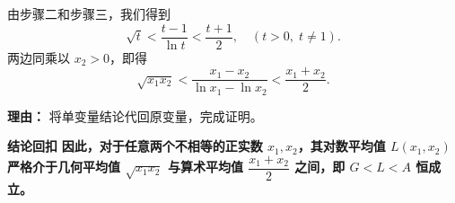 \begin{proofbox}
\begin{description}[style=nextline, leftmargin=2.8em, labelsep=0.5em, itemsep=0.55em]
    \item[\textbf{步骤四（合并结论）：}] 由步骤二和步骤三，我们得到
    \[
    \sqrt{t} < \frac{t-1}{\ln t} < \frac{t+1}{2},\quad (t>0,\; t\neq 1).
    \]
    两边同乘以 $x_2>0$，即得
    \[
    \sqrt{x_1 x_2} < \frac{x_1 - x_2}{\ln x_1 - \ln x_2} < \frac{x_1 + x_2}{2}.
    \]
    \par\textbf{理由：} 将单变量结论代回原变量，完成证明。
\end{description}

\medskip
\textbf{\textcolor{CProof}{结论回扣}}
\textbf{因此，对于任意两个不相等的正实数 $x_1, x_2$，其对数平均值 $L(x_1, x_2)$ 严格介于几何平均值 $\sqrt{x_1 x_2}$ 与算术平均值 $\dfrac{x_1+x_2}{2}$ 之间，即 $G < L < A$ 恒成立。}
\end{proofbox}
